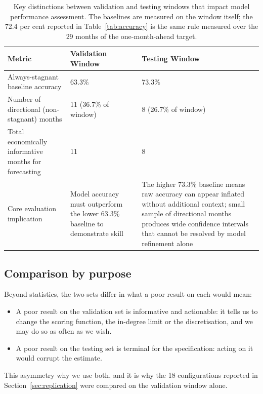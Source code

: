 \documentclass[11pt,a4paper]{article}
\begin{document}
\begin{table}[H]
\centering
\caption{Key distinctions between validation and testing windows that impact model performance
assessment. The baselines are measured on the window itself; the 72.4 per cent reported in
Table~\ref{tab:accuracy} is the same rule measured over the 29 months of the one-month-ahead
target.}
\label{tab:window_implications}
\renewcommand{\arraystretch}{1.3}
\begin{tabular}{@{}p{3.5cm}p{5.2cm}p{5.2cm}@{}}
\toprule
\textbf{Metric} & \textbf{Validation Window} & \textbf{Testing Window} \\
\midrule
Always-stagnant baseline accuracy & 63.3\% & 73.3\% \\
Number of directional (non-stagnant) months & 11 (36.7\% of window) & 8 (26.7\% of window) \\
Total economically informative months for forecasting & 11 & 8 \\
\midrule
Core evaluation implication & Model accuracy must outperform the lower 63.3\% baseline to demonstrate skill & The higher 73.3\% baseline means raw accuracy can appear inflated without additional context; small sample of directional months produces wide confidence intervals that cannot be resolved by model refinement alone \\
\bottomrule
\end{tabular}
\end{table}

\subsection{Comparison by purpose}

Beyond statistics, the two sets differ in what a poor result on each would mean:
 
\begin{itemize}
    \item A poor result on the validation set is informative and actionable: it tells 
    us to change the scoring function, the in-degree limit or the discretisation, 
    and we may do so as often as we wish.
    \item A poor result on the testing set is terminal for the specification: acting 
    on it would corrupt the estimate.
\end{itemize}

This
asymmetry why we use both, and it is why the 18 configurations reported in
Section~\ref{sec:replication} were compared on the validation window alone.
\end{document}
